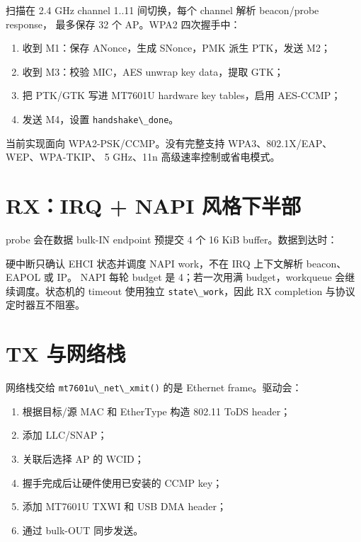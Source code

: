 

扫描在 2.4 GHz channel 1..11 间切换，每个 channel 解析 beacon/probe
response， 最多保存 32 个 AP。WPA2 四次握手中：

\begin{enumerate}
\def\labelenumi{\arabic{enumi}.}
\tightlist
\item
  收到 M1：保存 ANonce，生成 SNonce，PMK 派生 PTK，发送 M2；
\item
  收到 M3：校验 MIC，AES unwrap key data，提取 GTK；
\item
  把 PTK/GTK 写进 MT7601U hardware key tables，启用 AES-CCMP；
\item
  发送 M4，设置 \passthrough{\lstinline!handshake\_done!}。
\end{enumerate}

当前实现面向 WPA2-PSK/CCMP。没有完整支持
WPA3、802.1X/EAP、WEP、WPA-TKIP、 5 GHz、11n 高级速率控制或省电模式。

\section{RX：IRQ + NAPI
风格下半部}\label{rxirq--napi-ux98ceux683cux4e0bux534aux90e8}

probe 会在数据 bulk-IN endpoint 预提交 4 个 16 KiB buffer。数据到达时：



硬中断只确认 EHCI 状态并调度 NAPI work，不在 IRQ 上下文解析
beacon、EAPOL 或 IP。 NAPI 每轮 budget 是 4；若一次用满
budget，workqueue 会继续调度。状态机的 timeout 使用独立
\passthrough{\lstinline!state\_work!}，因此 RX completion
与协议定时器互不阻塞。

\section{TX 与网络栈}\label{tx-ux4e0eux7f51ux7edcux6808}

网络栈交给 \passthrough{\lstinline!mt7601u\_net\_xmit()!} 的是 Ethernet
frame。驱动会：

\begin{enumerate}
\def\labelenumi{\arabic{enumi}.}
\tightlist
\item
  根据目标/源 MAC 和 EtherType 构造 802.11 ToDS header；
\item
  添加 LLC/SNAP；
\item
  关联后选择 AP 的 WCID；
\item
  握手完成后让硬件使用已安装的 CCMP key；
\item
  添加 MT7601U TXWI 和 USB DMA header；
\item
  通过 bulk-OUT 同步发送。
\end{enumerate}


